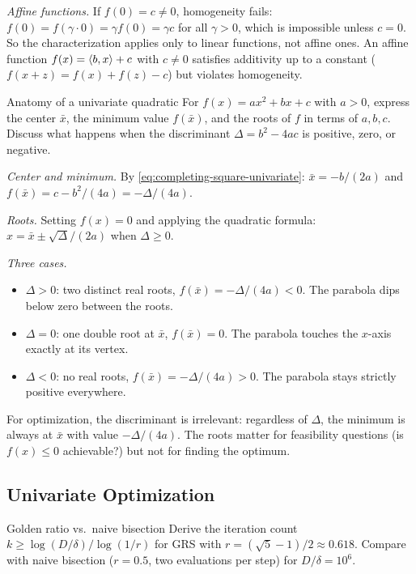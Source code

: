 \textit{Affine functions.}
If $f(0) = c \neq 0$, homogeneity fails: $f(0) = f(\gamma \cdot 0) = \gamma f(0) = \gamma c$ for all $\gamma > 0$, which is impossible unless $c = 0$.
So the characterization applies only to linear functions, not affine ones.
An affine function $f(x) = \langle b, x\rangle + c$ with $c \neq 0$ satisfies additivity up to a constant ($f(x + z) = f(x) + f(z) - c$) but violates homogeneity.

\begin{exercise}{Anatomy of a univariate quadratic}\label{ex:quadratic-roots}
	For $f(x) = ax^2 + bx + c$ with $a > 0$, express the center $\bar{x}$, the minimum value $f(\bar{x})$, and the roots of $f$ in terms of $a, b, c$.
	Discuss what happens when the discriminant $\Delta = b^2 - 4ac$ is positive, zero, or negative.
\end{exercise}

\solution
\textit{Center and minimum.}
By \cref{eq:completing-square-univariate}: $\bar{x} = -b/(2a)$ and $f(\bar{x}) = c - b^2/(4a) = -\Delta/(4a)$.

\textit{Roots.}
Setting $f(x) = 0$ and applying the quadratic formula: $x = \bar{x} \pm \sqrt{\Delta}/(2a)$ when $\Delta \geq 0$.

\textit{Three cases.}
\begin{itemize}
	\item $\Delta > 0$: two distinct real roots, $f(\bar{x}) = -\Delta/(4a) < 0$.
		The parabola dips below zero between the roots.
	\item $\Delta = 0$: one double root at $\bar{x}$, $f(\bar{x}) = 0$.
		The parabola touches the $x$-axis exactly at its vertex.
	\item $\Delta < 0$: no real roots, $f(\bar{x}) = -\Delta/(4a) > 0$.
		The parabola stays strictly positive everywhere.
\end{itemize}
For optimization, the discriminant is irrelevant: regardless of $\Delta$, the minimum is always at $\bar{x}$ with value $-\Delta/(4a)$.
The roots matter for feasibility questions (is $f(x) \leq 0$ achievable?) but not for finding the optimum.

\subsection{Univariate Optimization}\label{app:ex-univariate}

\begin{exercise}{Golden ratio vs.\ naive bisection}\label{ex:golden-complexity}
	Derive the iteration count $k \geq \log(D/\delta) / \log(1/r)$ for GRS with $r = (\sqrt{5}-1)/2 \approx 0.618$.
	Compare with naive bisection ($r = 0.5$, two evaluations per step) for $D/\delta = 10^6$.
\end{exercise}

